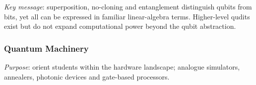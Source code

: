 

\emph{Key message}: superposition, no-cloning and entanglement distinguish qubits from bits, 
yet all can be expressed in familiar linear-algebra terms. 
Higher-level qudits exist but do not expand computational power beyond the qubit abstraction.

\subsubsection{Quantum Machinery}

\emph{Purpose}: orient students within the hardware landscape; analogue simulators, annealers, photonic devices and gate-based processors.


